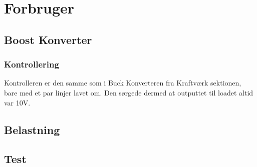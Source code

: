 \documentclass[../main.tex]{subfiles}
\begin{document}
\chapter{Forbruger} \label{Chap:Forbruger}

\section{Boost Konverter}
\subsection{Kontrollering}
Kontrolleren er den samme som i Buck Konverteren fra Kraftværk sektionen, bare med et par linjer lavet om. Den sørgede dermed at outputtet til loadet altid var 10V.

\section{Belastning}
\section{Test}
\end{document}
